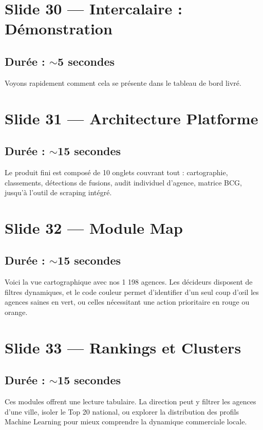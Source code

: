 \documentclass[11pt,a4paper]{article}
\begin{document}
\section{Slide 30 --- Intercalaire : Démonstration}
\subsection{Durée : $\sim$5 secondes}
Voyons rapidement comment cela se présente dans le tableau de bord livré.

\section{Slide 31 --- Architecture Platforme}
\subsection{Durée : $\sim$15 secondes}
Le produit fini est composé de 10 onglets couvrant tout : cartographie, classements, détections de fusions, audit individuel d'agence, matrice BCG, jusqu'à l'outil de scraping intégré.

\section{Slide 32 --- Module Map}
\subsection{Durée : $\sim$15 secondes}
Voici la vue cartographique avec nos 1 198 agences. Les décideurs disposent de filtres dynamiques, et le code couleur permet d'identifier d'un seul coup d'œil les agences saines en vert, ou celles nécessitant une action prioritaire en rouge ou orange.

\section{Slide 33 --- Rankings et Clusters}
\subsection{Durée : $\sim$15 secondes}
Ces modules offrent une lecture tabulaire. La direction peut y filtrer les agences d'une ville, isoler le Top 20 national, ou explorer la distribution des profils Machine Learning pour mieux comprendre la dynamique commerciale locale.
\end{document}
